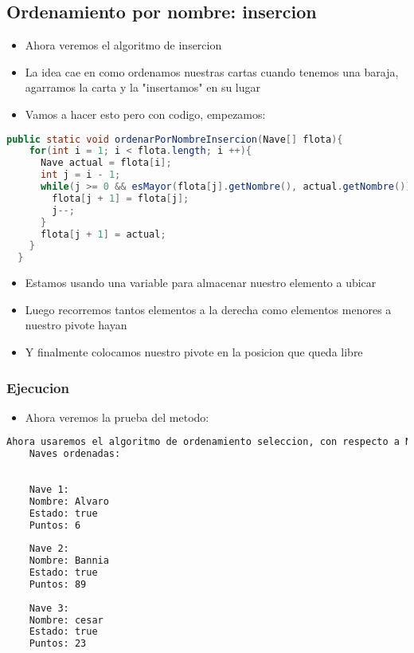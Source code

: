 \subsection{Ordenamiento por nombre: insercion}
\begin{itemize}
    \item Ahora veremos el algoritmo de insercion
    \item La idea cae en como ordenamos nuestras cartas cuando tenemos una baraja, agarramos la carta y la "insertamos" en su lugar
    \item Vamos a hacer esto pero con codigo, empezamos:
\end{itemize}
\begin{lstlisting}[language=java, caption={Metodo para ordenar por nombre}]
      public static void ordenarPorNombreInsercion(Nave[] flota){
    for(int i = 1; i < flota.length; i ++){
      Nave actual = flota[i];
      int j = i - 1;
      while(j >= 0 && esMayor(flota[j].getNombre(), actual.getNombre())){
        flota[j + 1] = flota[j];
        j--;
      }
      flota[j + 1] = actual;
    }
  }
\end{lstlisting}
\begin{itemize}
    \item Estamos usando una variable para almacenar nuestro elemento a ubicar
    \item Luego recorremos tantos elementos a la derecha como elementos menores a nuestro pivote hayan
    \item Y finalmente colocamos nuestro pivote en la posicion que queda libre
\end{itemize}
\subsubsection{Ejecucion}
\begin{itemize}
    \item Ahora veremos la prueba del metodo:
\end{itemize}
    \begin{lstlisting}[language=bash, caption={Prueba del metodo}]
    Ahora usaremos el algoritmo de ordenamiento seleccion, con respecto a Nombres.
    Naves ordenadas:
    
    
    Nave 1:
    Nombre: Alvaro
    Estado: true
    Puntos: 6
    
    Nave 2:
    Nombre: Bannia
    Estado: true
    Puntos: 89
    
    Nave 3:
    Nombre: cesar
    Estado: true
    Puntos: 23
    
      
\end{lstlisting}





